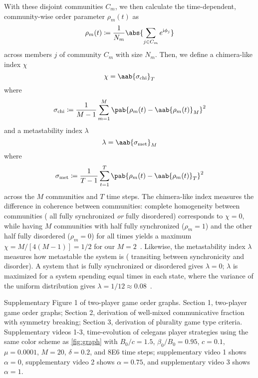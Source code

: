 \documentclass[pdflatex,lineno,referee,sn-nature]{sn-jnl}
\begin{document}
With these disjoint communities $C_m$, we then calculate
the time-dependent, community-wise order parameter $\rho_m(t)$
as
\begin{equation}
  \rho_m(t) \coloneqq \frac{1}{N_m} \abs{\sum_{j \in C_m} e^{\im \phi_j}}
\end{equation}
across members $j$ of community $C_m$ with size $N_m$.
Then, we define a chimera-like index $\chi$
\begin{equation}
  \chi = \aab{
    \sigma_{\text{chi}}}_T
  \label{eq:chimera_index}
\end{equation}
where
\begin{equation*}
    \sigma_{\text{chi}} \coloneqq \frac{1}{M-1} \sum_{m=1}^M
    \pab{\rho_m(t) - \aab{\rho_m(t)}_M}^2
\end{equation*}
and a metastability index $\lambda$
\begin{equation}
  \lambda = \aab{
    \sigma_{\text{met}}}_M
  \label{eq:metastability_index}
\end{equation}
where
\begin{equation*}
    \sigma_{\text{met}} \coloneqq \frac{1}{T-1} \sum_{t=1}^T
    \pab{\rho_m(t) - \aab{\rho_m(t)}_T}^2
\end{equation*}
across the $M$ communities and $T$ time steps.
The chimera-like index measures the difference in coherence between communities:
complete homogeneity between communities
(\eg{} all fully synchronized \emph{or} fully disordered)
corresponds to $\chi = 0$,
while having $M$ communities
with half fully synchronized ($\rho_m = 1$)
and the other half fully disordered ($\rho_m = 0$)
for all times yields a maximum $\chi = M/[4(M-1)]
= 1/2$ for our $M=2$~\citep{shanahan2010metastable}.
Likewise, the metastability index $\lambda$ measures how metastable
the system is (\ie{} transiting between synchronicity and disorder).
A system that is fully synchronized or disordered gives $\lambda = 0$;
$\lambda$ is maximized for a system spending equal times in each state,
where the variance of the uniform distribution gives
$\lambda = 1/12 \approx \num{0.08}$~\citep{shanahan2010metastable}.

\backmatter{}

Supplementary Figure 1 of two-player game order graphs.
Section 1, two-player game order graphs;
Section 2, derivation of well-mixed communicative fraction
with symmetry breaking;
Section 3, derivation of plurality game type criteria.
Supplementary videos 1-3,
time-evolution of \gls{celegans} player strategies
using the same color scheme as \cref{fig:graph}
with $B_0/c = 1.5$, $\beta_0/B_0 = 0.95$, $c = 0.1$,
$\mu = 0.0001$, $M = 20$, $\delta = 0.2$, and \num{8E6} time steps;
supplementary video 1 shows $\alpha = 0$,
supplementary video 2 shows $\alpha = 0.75$,
and
supplementary video 3 shows $\alpha = 1$.
\end{document}

